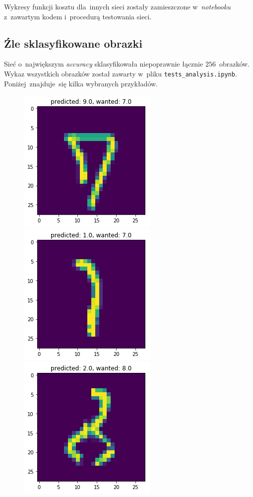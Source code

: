 \documentclass[11pt, a4paper]{article}
\begin{document}
Wykresy funkcji kosztu dla~innych sieci zostały zamieszczone w~\textit{notebooku} z~zawartym kodem i~procedurą testowania sieci.

\subsection{Źle sklasyfikowane obrazki}
Sieć o~największym \textit{accuracy} sklasyfikowała niepoprawnie łącznie $256$~obrazków.
Wykaz wszystkich obrazków został zawarty w~pliku \texttt{tests\_analysis.ipynb}. Poniżej~znajduje~się
kilka wybranych przykładów.

 \begin{figure}[H]
		\centering
		\includegraphics[scale=0.5]{wrong_class_0.png}
		\includegraphics[scale=0.5]{wrong_class_1.png}
		\includegraphics[scale=0.5]{wrong_class_2.png}

\end{figure}
\end{document}
